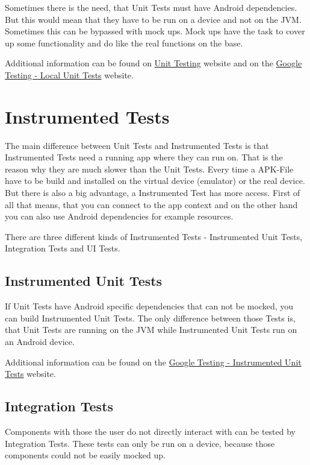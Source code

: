 	Sometimes there is the need, that Unit Tests must have Android dependencies. But this would mean that they have to be run on a device and not on the JVM. Sometimes this can be bypassed with mock ups. Mock ups have the task to cover up some functionality and do like the real functions on the base.
	
	Additional information can be found on \href{https://developer.android.com/training/testing/unit-testing/}{Unit Testing} website and on the \href{https://developer.android.com/training/testing/unit-testing/local-unit-tests}{Google Testing - Local Unit Tests} website.
	
	\section{Instrumented Tests}
	The main difference between Unit Tests and Instrumented Tests is that Instrumented Tests need a running app where they can run on. That is the reason why they are much slower than the Unit Tests. Every time a APK-File have to be build and installed on the virtual device (emulator) or the real device. But there is also a big advantage, a Instrumented Test has more access. First of all that means, that you can connect to the app context and on the other hand you can also use Android dependencies for example resources.
	
	There are three different kinds of Instrumented Tests - Instrumented Unit Tests, Integration Tests and UI Tests.
		
	\subsection{Instrumented Unit Tests}
	If Unit Tests have Android specific dependencies that can not be mocked, you can build Instrumented Unit Tests. The only difference between those Tests is, that Unit Tests are running on the JVM while Instrumented Unit Tests run on an Android device.
	
	Additional information can be found on the \href{https://developer.android.com/training/testing/unit-testing/instrumented-unit-tests}{Google Testing - Instrumented Unit Tests} website.
	
	\subsection{Integration Tests}
	Components with those the user do not directly interact with can be tested by Integration Tests. These tests can only be run on a device, because those components could not be easily mocked up.
	
